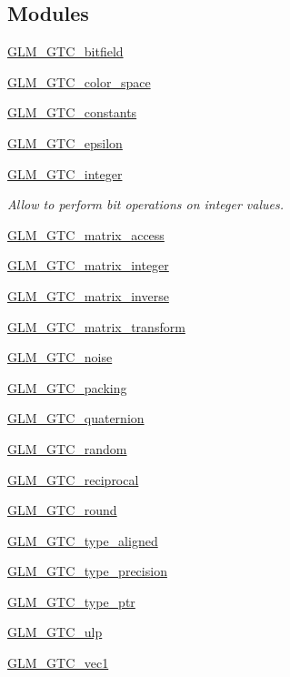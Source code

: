 \subsection*{Modules}
\begin{DoxyCompactItemize}
\item 
\hyperlink{group__gtc__bitfield}{G\+L\+M\+\_\+\+G\+T\+C\+\_\+bitfield}
\item 
\hyperlink{group__gtc__color__space}{G\+L\+M\+\_\+\+G\+T\+C\+\_\+color\+\_\+space}
\item 
\hyperlink{group__gtc__constants}{G\+L\+M\+\_\+\+G\+T\+C\+\_\+constants}
\item 
\hyperlink{group__gtc__epsilon}{G\+L\+M\+\_\+\+G\+T\+C\+\_\+epsilon}
\item 
\hyperlink{group__gtc__integer}{G\+L\+M\+\_\+\+G\+T\+C\+\_\+integer}
\begin{DoxyCompactList}\small\item\em Allow to perform bit operations on integer values. \end{DoxyCompactList}\item 
\hyperlink{group__gtc__matrix__access}{G\+L\+M\+\_\+\+G\+T\+C\+\_\+matrix\+\_\+access}
\item 
\hyperlink{group__gtc__matrix__integer}{G\+L\+M\+\_\+\+G\+T\+C\+\_\+matrix\+\_\+integer}
\item 
\hyperlink{group__gtc__matrix__inverse}{G\+L\+M\+\_\+\+G\+T\+C\+\_\+matrix\+\_\+inverse}
\item 
\hyperlink{group__gtc__matrix__transform}{G\+L\+M\+\_\+\+G\+T\+C\+\_\+matrix\+\_\+transform}
\item 
\hyperlink{group__gtc__noise}{G\+L\+M\+\_\+\+G\+T\+C\+\_\+noise}
\item 
\hyperlink{group__gtc__packing}{G\+L\+M\+\_\+\+G\+T\+C\+\_\+packing}
\item 
\hyperlink{group__gtc__quaternion}{G\+L\+M\+\_\+\+G\+T\+C\+\_\+quaternion}
\item 
\hyperlink{group__gtc__random}{G\+L\+M\+\_\+\+G\+T\+C\+\_\+random}
\item 
\hyperlink{group__gtc__reciprocal}{G\+L\+M\+\_\+\+G\+T\+C\+\_\+reciprocal}
\item 
\hyperlink{group__gtc__round}{G\+L\+M\+\_\+\+G\+T\+C\+\_\+round}
\item 
\hyperlink{group__gtc__type__aligned}{G\+L\+M\+\_\+\+G\+T\+C\+\_\+type\+\_\+aligned}
\item 
\hyperlink{group__gtc__type__precision}{G\+L\+M\+\_\+\+G\+T\+C\+\_\+type\+\_\+precision}
\item 
\hyperlink{group__gtc__type__ptr}{G\+L\+M\+\_\+\+G\+T\+C\+\_\+type\+\_\+ptr}
\item 
\hyperlink{group__gtc__ulp}{G\+L\+M\+\_\+\+G\+T\+C\+\_\+ulp}
\item 
\hyperlink{group__gtc__vec1}{G\+L\+M\+\_\+\+G\+T\+C\+\_\+vec1}
\end{DoxyCompactItemize}


